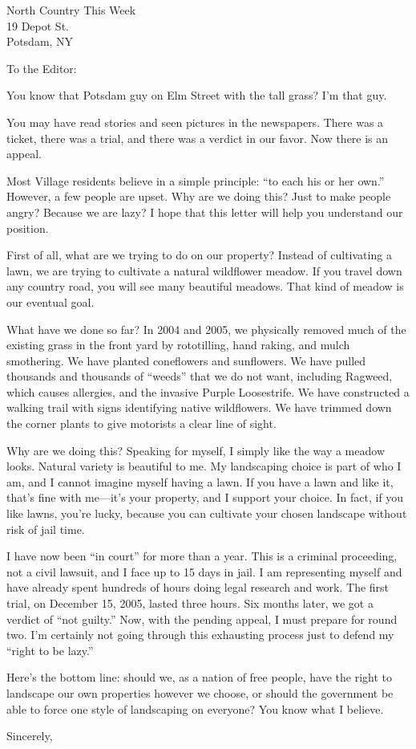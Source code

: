 \documentclass[12pt]{letter}
\begin{document}
\begin{letter}{North Country This Week\\19 Depot St.\\Potsdam, NY}

\address{93 Elm St.\\Potsdam, NY 13676}

\signature{Jason Rohrer}


\opening{To the Editor:}

You know that Potsdam guy on Elm Street with the tall grass?  I'm that guy.

You may have read stories and seen pictures in the newspapers.  There was a ticket, there was a trial, and there was a verdict in our favor.  Now there is an appeal.

Most Village residents believe in a simple principle:  ``to each his or her own.''  However, a few people are upset.  Why are we doing this?  Just to make people angry?  Because we are lazy?  I hope that this letter will help you understand our position.

First of all, what are we trying to do on our property?  Instead of cultivating a lawn, we are trying to cultivate a natural wildflower meadow.  If you travel down any country road, you will see many beautiful meadows.  That kind of meadow is our eventual goal.

What have we done so far?  In 2004 and 2005, we physically removed much of the existing grass in the front yard by rototilling, hand raking, and mulch smothering.  We have planted coneflowers and sunflowers.  We have pulled thousands and thousands of ``weeds'' that we do not want, including Ragweed, which causes allergies, and the invasive Purple Loosestrife.  We have constructed a walking trail with signs identifying native wildflowers.  We have trimmed down the corner plants to give motorists a clear line of sight.

Why are we doing this?  Speaking for myself, I simply like the way a meadow looks.  Natural variety is beautiful to me.  My landscaping choice is part of who I am, and I cannot imagine myself having a lawn.  If you have a lawn and like it, that's fine with me---it's your property, and I support your choice.  In fact, if you like lawns, you're lucky, because you can cultivate your chosen landscape without risk of jail time.

I have now been ``in court'' for more than a year.  This is a criminal proceeding, not a civil lawsuit, and I face up to 15 days in jail.  I am representing myself and have already spent hundreds of hours doing legal research and work.  The first trial, on December 15, 2005, lasted three hours.  Six months later, we got a verdict of ``not guilty.''  Now, with the pending appeal, I must prepare for round two.  I'm certainly not going through this exhausting process just to defend my ``right to be lazy.''

Here's the bottom line:  should we, as a nation of free people, have the right to landscape our own properties however we choose, or should the government be able to force one style of landscaping on everyone?  You know what I believe.


\closing{Sincerely,}

\end{letter}
\end{document}
